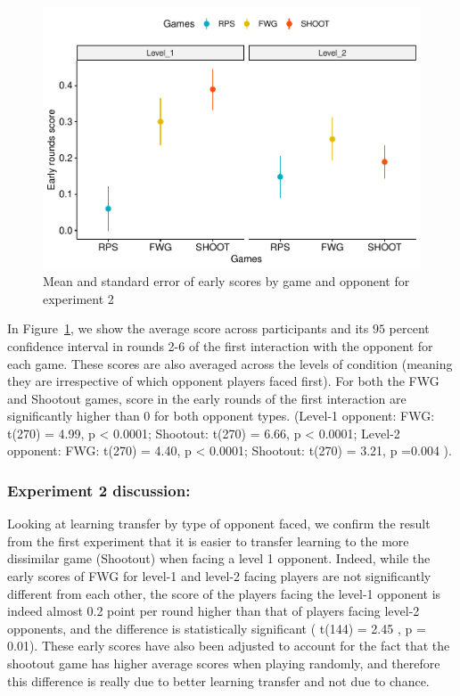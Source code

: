 \documentclass[man,floatsintext]{apa6}
\begin{document}
\begin{figure}

{\centering \includegraphics{paper_draft_2021_files/figure-latex/exp2-early-scores-1} 

}

\caption{Mean and standard error of early scores by game and opponent for experiment 2}\label{fig:exp2-early-scores}
\end{figure}

In Figure~\ref{fig:exp2-early-scores}, we show the average score across participants and its \(95\) percent confidence interval in rounds 2-6 of the first interaction with the opponent for each game. These scores are also averaged across the levels of condition (meaning they are irrespective of which opponent players faced first). For both the FWG and Shootout games, score in the early rounds of the first interaction are significantly higher than 0 for both opponent types. (Level-1 opponent: FWG: t(270) = 4.99, p \textless{} 0.0001; Shootout: t(270) = 6.66, p \textless{} 0.0001; Level-2 opponent: FWG: t(270) = 4.40, p \textless{} 0.0001; Shootout: t(270) = 3.21, p =0.004 ).

\hypertarget{experiment-2-discussion}{%
\subsubsection{Experiment 2 discussion:}\label{experiment-2-discussion}}

Looking at learning transfer by type of opponent faced, we confirm the result from the first experiment that it is easier to transfer learning to the more dissimilar game (Shootout) when facing a level 1 opponent. Indeed, while the early scores of FWG for level-1 and level-2 facing players are not significantly different from each other, the score of the players facing the level-1 opponent is indeed almost 0.2 point per round higher than that of players facing level-2 opponents, and the difference is statistically significant ( t(144) = 2.45 , p = 0.01). These early scores have also been adjusted to account for the fact that the shootout game has higher average scores when playing randomly, and therefore this difference is really due to better learning transfer and not due to chance.
\end{document}
